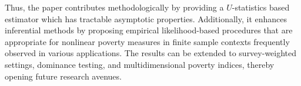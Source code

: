 \documentclass[11pt]{article}
\begin{document}
Thus, the paper contributes methodologically by providing a $U$-statistics based estimator which has tractable asymptotic properties. Additionally, it enhances inferential methods by proposing empirical likelihood-based procedures that are appropriate for nonlinear poverty measures in finite sample contexts frequently observed in various applications. The results can be extended to survey-weighted settings, dominance testing, and multidimensional poverty indices, thereby opening future research avenues.

\end{document}
